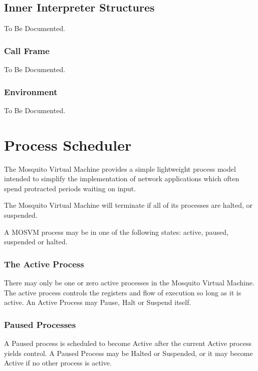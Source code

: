 \documentclass[notitlepage,oneside]{book}
\begin{document}
\section{Inner Interpreter Structures}
\label{ii-struct}

To Be Documented.

\subsection{Call Frame}
\label{s-callframe}

To Be Documented.

\subsection{Environment}
\label{s-environment}

To Be Documented.

\chapter{Process Scheduler}
\label{proc}

The Mosquito Virtual Machine provides a simple lightweight process model intended to simplify the implementation of network applications which often spend protracted periods waiting on input.

The Mosquito Virtual Machine will terminate if all of its processes are halted, or suspended.

A MOSVM process may be in one of the following states: active, paused, suspended or halted.

\subsection{The Active Process}

There may only be one or zero active processes in the Mosquito Virtual Machine.  The active process controls the registers and flow of execution so
long as it is active.  An Active Process may Pause, Halt or Suspend itself.

\subsection{Paused Processes}

A Paused process is scheduled to become Active after the current Active process yields control.  A Paused Process may be Halted or Suspended, or it may become Active if no other process is active.
\end{document}
